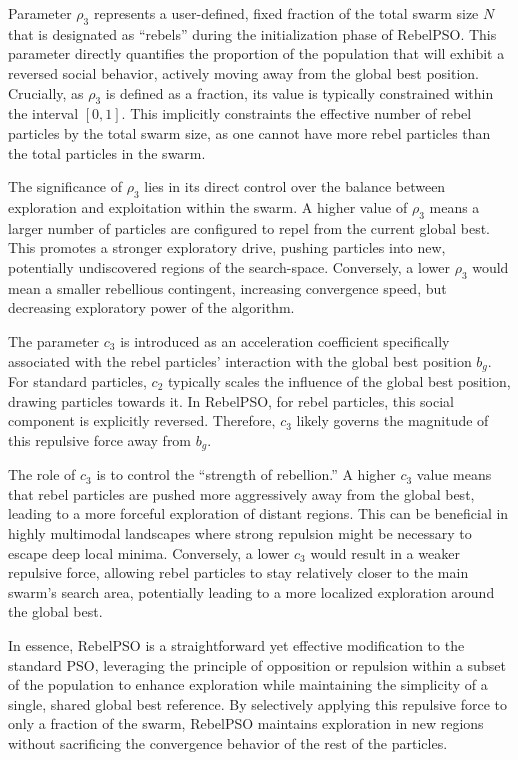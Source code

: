 {Parameter $\rho_3$ represents a user-defined, fixed fraction of the total swarm size $N$ that is designated as ``rebels'' during the initialization phase of RebelPSO. This parameter directly quantifies the proportion of the population that will exhibit a reversed social behavior, actively moving away from the global best position.
Crucially, as $\rho_3$ is defined as a fraction, its value is typically constrained within the interval $[0,1]$.
This implicitly constraints the effective number of rebel particles by the total swarm size, as one cannot have more rebel particles than the total particles in the swarm.

The significance of $\rho_3$ lies in its direct control over the balance between exploration and exploitation within the swarm. A higher value of $\rho_3$ means a larger number of particles are configured to repel from the current global best. This promotes a stronger exploratory drive, pushing particles into new, potentially undiscovered regions of the \gls{search-space}. Conversely, a lower $\rho_3$ would mean a smaller rebellious contingent, increasing convergence speed, but decreasing exploratory power of the algorithm.

\enlargethispage{-.3\baselineskip}
The parameter $c_3$ is introduced as an acceleration coefficient specifically associated with the rebel particles' interaction with the global best position $b_g$. For standard particles, $c_2$ typically scales the influence of the global best position, drawing particles towards it. In RebelPSO, for rebel particles, this social component is explicitly reversed. Therefore, $c_3$ likely governs the magnitude of this repulsive force away from $b_g$.

The role of $c_3$ is to control the ``strength of rebellion.'' A higher $c_3$ value means that rebel particles are pushed more aggressively away from the global best, leading to a more forceful exploration of distant regions. This can be beneficial in highly multimodal landscapes where strong repulsion might be necessary to escape deep local minima. Conversely, a lower $c_3$ would result in a weaker repulsive force, allowing rebel particles to stay relatively closer to the main swarm's search area, potentially leading to a more localized exploration around the global best.

In essence, RebelPSO is a straightforward yet effective modification to the standard PSO, leveraging the principle of opposition or repulsion within a subset of the population to enhance exploration while maintaining the simplicity of a single, shared global best reference. By selectively applying this repulsive force to only a fraction of the swarm, RebelPSO maintains exploration in new regions without sacrificing the convergence behavior of the rest of the particles.

}

